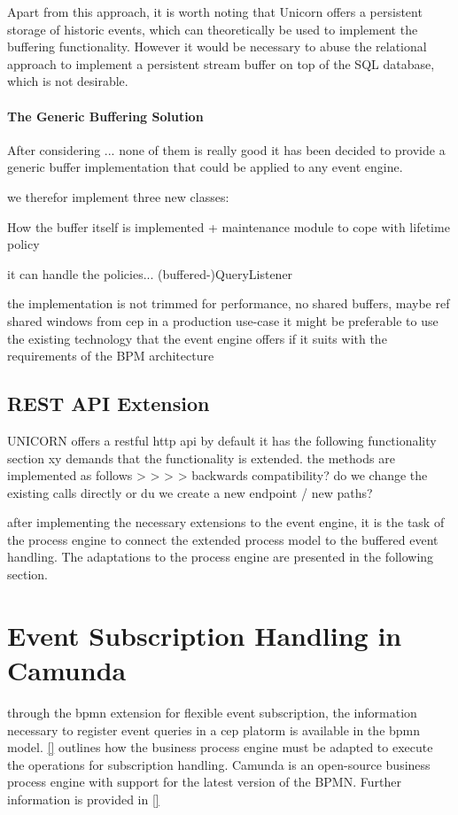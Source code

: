 Apart from this approach, it is worth noting that Unicorn offers a persistent storage of historic events, which can theoretically be used to implement the buffering functionality.
However it would be necessary to abuse the relational approach to implement a persistent stream buffer on top of the SQL database, which is not desirable.

\paragraph{The Generic Buffering Solution}
After considering ... 
none of them is really good
it has been decided to provide a generic buffer implementation that could be applied to any event engine.

we therefor implement three new classes:

How the buffer itself is implemented
+ maintenance module to cope with lifetime policy

it can handle the policies...
(buffered-)QueryListener

the implementation is not trimmed for performance, no shared buffers, maybe ref shared windows from cep
in a production use-case it might be preferable to use the existing technology that the event engine offers if it suits with the requirements of the BPM architecture

\subsection{REST API Extension}
UNICORN offers a restful http api
by default it has the following functionality
section xy demands that the functionality is extended.
the methods are implemented as follows
>
>
>
>
backwards compatibility? do we change the existing calls directly or du we create a new endpoint / new paths?


after implementing the necessary extensions to the event engine, it is the task of the process engine to connect the extended process model to the buffered event handling.
The adaptations to the process engine are presented in the following section.

\section{Event Subscription Handling in Camunda}\label{ch:implcamunda}
through the bpmn extension for flexible event subscription, the information necessary to register event queries in a cep platorm is available in the bpmn model.
\autoref{} outlines how the business process engine must be adapted to execute the operations for subscription handling.
Camunda is an open-source business process engine with support for the latest version of the BPMN. Further information is provided in \autoref{}


